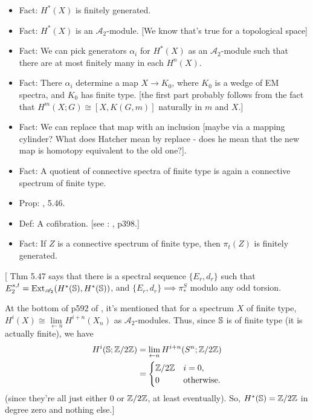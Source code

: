 \documentclass{MetricNotes2023}
\def\bb{\ensuremath\mathbb}
\def\inte{\ensuremath\mathbb{Z}}
\DeclareMathOperator{\Ext}{Ext}
\begin{document}
\begin{itemize}
\item Fact: \(H^*(X)\) is finitely generated.
\item Fact: \(H^*(X)\) is an \(\mathscr{A}_2\)-module. [We know that's true for a topological space]
\item Fact: We can pick generators \(\alpha_i\) for \(H^*(X)\) as an \(\mathscr{A}_2\)-module such that there are at most finitely many in each \(H^n(X)\).
\item Fact: There \(\alpha_i\) determine a map \(X \to K_0\), where \(K_0\) is a wedge of EM spectra, and \(K_0\) has finite type. [the first part probably follows from the fact that \(H^m(X; G)\cong [X, K(G,m)]\) naturally in \(m\) and \(X\).]
\item Fact: We can replace that map with an inclusion [maybe via a mapping cylinder? What does Hatcher mean by replace - does he mean that the new map is homotopy equivalent to the old one?].
\item Fact: A quotient of connective spectra of finite type is again a connective spectrum of finite type.
\item Prop: \autocite{hatcher5}, 5.46.
\item Def: A cofibration. [see : \autocite{hatcher}, p398.]
\item Fact: If \(Z\) is a connective spectrum of finite type, then \(\pi_t(Z)\) is finitely generated.
\end{itemize}

[\autocite{hatcher5} Thm 5.47 says that there is a spectral sequence \(\{E_r, d_r\}\) such that \(E_2^{s,t}=\Ext_{\mathscr{A}_2}(H^*(\bb{S}), H^*(\bb{S}))\), and \(\{E_r, d_r\}\implies \pi^S_*\) modulo any odd torsion.

At the bottom of p592 of \autocite{hatcher5}, it's mentioned that for a spectrum \(X\) of finite type, \(H^i(X)\cong \lim\limits_{\leftarrow n}H^{i+n}(X_n)\) as \(\mathscr{A}_2\)-modules. Thus, since \(\bb{S}\) is of finite type (it is actually finite), we have
\begin{align*}
H^i(\bb{S}; \inte/2\inte)&=\lim\limits_{\leftarrow n}H^{i+n}(S^n; \inte/2\inte)\\
&=\begin{cases}
\inte/2\inte & i = 0,\\
0 & \text{otherwise.}
\end{cases}
\end{align*}
(since they're all just either \(0\) or \(\inte/2\inte\), at least eventually). So, \(H^*(\bb{S})=\inte/2\inte\) in degree zero and nothing else.]
\end{document}
